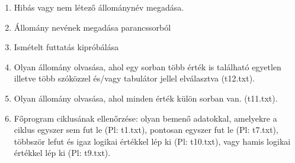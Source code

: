 \documentclass[12pt,a4paper]{article}			%
\begin{document}
		\renewcommand{\labelenumi}{\arabic{enumi}.}
		 \vspace{2mm}
		\begin{enumerate}[1, itemsep=0ex]
			\item Hibás vagy nem létező állománynév megadása.
			\item Állomány nevének megadása parancssorból
			\item Ismételt futtatás kipróbálása
			\item Olyan állomány olvasása, ahol egy sorban több érték is található egyetlen illetve több szóközzel és/vagy tabulátor jellel elválasztva (t12.txt).
			\item Olyan állomány olvasása, ahol minden érték külön sorban van. (t11.txt).
			\item Főprogram ciklusának ellenőrzése: olyan bemenő adatokkal, amelyekre a ciklus egyszer sem fut le (Pl: t1.txt), pontosan egyszer fut le (Pl: t7.txt), többször lefut és igaz logikai értékkel lép ki (Pl: t10.txt), vagy hamis logikai értékkel lép ki (Pl: t9.txt).
		\end{enumerate}
\end{document}
